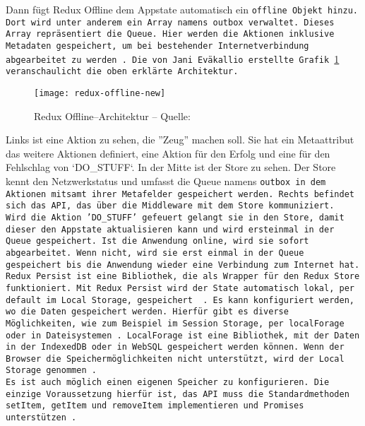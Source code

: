 Dann fügt Redux Offline dem \gls{App}state automatisch ein \tt{offline} Objekt hinzu. Dort wird unter anderem ein Array namens \tt{outbox} verwaltet.
Dieses Array repräsentiert die \gls{Queue}. Hier werden die Aktionen inklusive Metadaten gespeichert, um bei bestehender Internetverbindung abgearbeitet zu werden~\cite{redux-offline-docs}.
Die von Jani Eväkallio erstellte Grafik \ref{fig:redux-offline} veranschaulicht die oben erklärte Architektur.
%
\begin{figure}[h]
  \centering
  \texttt{[image: redux-offline-new]}
  \grayRule
  \caption[Redux Offline]{Redux Offline--Architektur -- Quelle:~\cite{redux-offline}}
  \label{fig:redux-offline}
\end{figure}
%
Links ist eine Aktion zu sehen, die ''Zeug'' machen soll. Sie hat ein Metaattribut das weitere Aktionen definiert, eine Aktion für den Erfolg und eine für den Fehlschlag von `DO\_STUFF`.
In der Mitte ist der Store zu sehen.
Der Store kennt den Netzwerkstatus und umfasst die \gls{Queue} namens \tt{outbox} in dem Aktionen mitsamt ihrer Metafelder gespeichert werden.
Rechts befindet sich das \gls{API}, das über die \gls{Middleware} mit dem Store kommuniziert.\\
Wird die Aktion 'DO\_STUFF' gefeuert gelangt sie in den Store, damit dieser den \gls{App}state aktualisieren kann und wird ersteinmal in der \gls{Queue} gespeichert.
Ist die Anwendung online, wird sie sofort abgearbeitet.
Wenn nicht, wird sie erst einmal in der \gls{Queue} gespeichert bis die Anwendung wieder eine Verbindung zum Internet hat.
%
%
Redux Persist ist eine Bibliothek, die als Wrapper für den Redux Store funktioniert.
Mit Redux Persist wird der State automatisch lokal, per default im Local Storage, gespeichert ~\cite{redux-persist}.
Es kann konfiguriert werden, wo die Daten gespeichert werden.
Hierfür gibt es diverse Möglichkeiten, wie zum Beispiel im Session Storage, per localForage oder in Dateisystemen~\cite{redux-persist-gh}.
LocalForage ist eine Bibliothek, mit der Daten in der IndexedDB oder in WebSQL gespeichert werden können.
Wenn der Browser die Speichermöglichkeiten nicht unterstützt, wird der Local Storage genommen~\cite{localforage}.\\
Es ist auch möglich einen eigenen Speicher zu konfigurieren.
Die einzige Voraussetzung hierfür ist, das \gls{API} muss die Standardmethoden \tt{setItem}, \tt{getItem} und \tt{removeItem} implementieren und Promises unterstützen~\cite{redux-persist-gh}.
%
%
